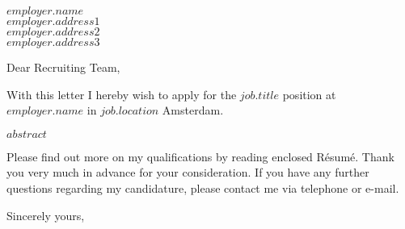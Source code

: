 \documentclass[10pt,a4paper]{letter}
\begin{document}
 
\begin{letter}{$employer.name$ \\ $employer.address1$ \\ $employer.address2$ \\ $employer.address3$} 
\opening{Dear Recruiting Team,} 
With this letter I hereby wish to apply for the \textbf{$job.title$} position at $employer.name$ in $job.location$ Amsterdam.

$abstract$


Please find out more on my qualifications by reading enclosed Résumé. Thank you very much in advance for your consideration. If you have any further questions regarding my candidature, please contact me via telephone or e-mail.


\closing{Sincerely yours,\\
 \\
}
 
\end{letter} 
\end{document}
